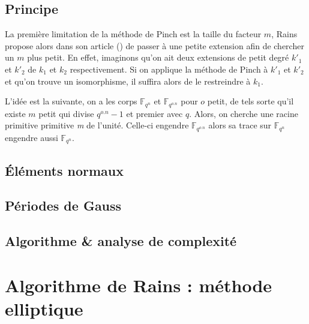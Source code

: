 \documentclass[a4paper]{article} %
\numberwithin{section}{part}
\numberwithin{equation}{section}
\newcommand\nroot[1]{\textit{#1}\up{\textit{ième}}}
\newcommand\GF[1]{\mathbb{F}_{#1}}
\begin{document}
\subsection{Principe}
La première limitation de la méthode de Pinch est la taille du facteur
$m$, Rains propose alors dans son article (\cite{Rai}) de passer à une petite
extension afin de chercher un $m$ plus petit. En effet, imaginons qu'on ait deux
extensions de petit degré $k'_1$ et $k'_2$ de $k_1$ et $k_2$ respectivement. Si
on applique la méthode de Pinch à $k'_1$ et $k'_2$ et qu'on trouve un
isomorphisme, il suffira alors de le restreindre à $k_1$.\par
L'idée est la suivante, on a les corps $\GF{q^n}$ et $\GF{q^{o.n}}$ pour $o$
petit, de tels sorte qu'il existe $m$ petit qui divise $q^{o.n} - 1$ et premier
avec $q$. Alors, on cherche une racine primitive primitive \nroot{m} de l'unité.
Celle-ci engendre $\GF{q^{o.n}}$ alors sa trace sur $\GF{q^n}$ engendre aussi
$\GF{q^n}$.

\subsection{Éléments normaux}

\subsection{Périodes de Gauss}

\subsection{Algorithme \& analyse de complexité}

\section{Algorithme de Rains : méthode elliptique}
\end{document}
